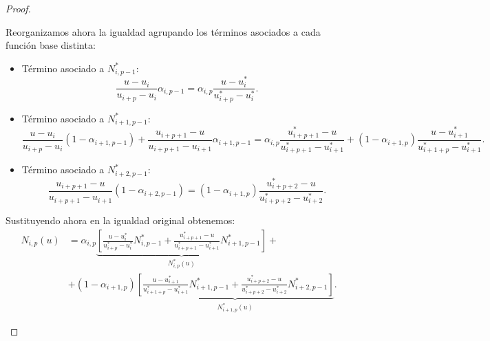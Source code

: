 \documentclass[11pt]{book}
\theoremstyle{plain} %
\theoremstyle{definition} %
\theoremstyle{definition} %
\begin{document}
\begin{proof}
\begin{itemize}
            Reorganizamos ahora la igualdad agrupando los términos asociados a cada función base distinta:
            \begin{itemize}
                \item Término asociado a $N^*_{i,p-1}$: $$\frac{u - u_i}{u_{i+p} - u_i} \alpha_{i,p-1} = \alpha_{i,p} \frac{u - u^*_i}{u^*_{i+p} - u^*_i}.$$
                \item Término asociado a $N^*_{i+1,p-1}$: $$\frac{u - u_i}{u_{i+p} - u_i}(1 - \alpha_{i+1,p-1}) + \frac{u_{i+p+1} - u}{u_{i+p+1} - u_{i+1}}\alpha_{i+1,p-1} = \alpha_{i,p} \frac{u^*_{i+p+1} - u}{u^*_{i+p+1} - u^*_{i+1}} + (1 - \alpha_{i+1,p}) \frac{u - u^*_{i+1}}{u^*_{i+1+p} - u^*_{i+1}}.$$
                \item Término asociado a $N^*_{i+2,p-1}$: $$\frac{u_{i+p+1} - u}{u_{i+p+1} - u_{i+1}} (1 - \alpha_{i+2,p-1}) = (1 - \alpha_{i+1,p}) \frac{u^*_{i+p+2} - u}{u^*_{i+p+2} - u^*_{i+2}}.$$
            \end{itemize}
            Sustituyendo ahora en la igualdad original obtenemos:
            \begin{align*}
                N_{i,p}(u) &= \alpha_{i,p} \underbrace{\left[ \frac{u - u^*_i}{u^*_{i+p} - u^*_i} N^*_{i,p-1} + \frac{u^*_{i+p+1} - u}{u^*_{i+p+1} - u^*_{i+1}} N^*_{i+1,p-1} \right]}_{N^*_{i,p}(u)}+ \\
                        &+ (1 - \alpha_{i+1,p}) \underbrace{\left[ \frac{u - u^*_{i+1}}{u^*_{i+1+p} - u^*_{i+1}} N^*_{i+1,p-1} + \frac{u^*_{i+p+2} - u}{u^*_{i+p+2} - u^*_{i+2}} N^*_{i+2,p-1} \right]}_{N^*_{i+1,p}(u)}.
            \end{align*}
    \end{itemize}
\end{proof}
\end{document}
